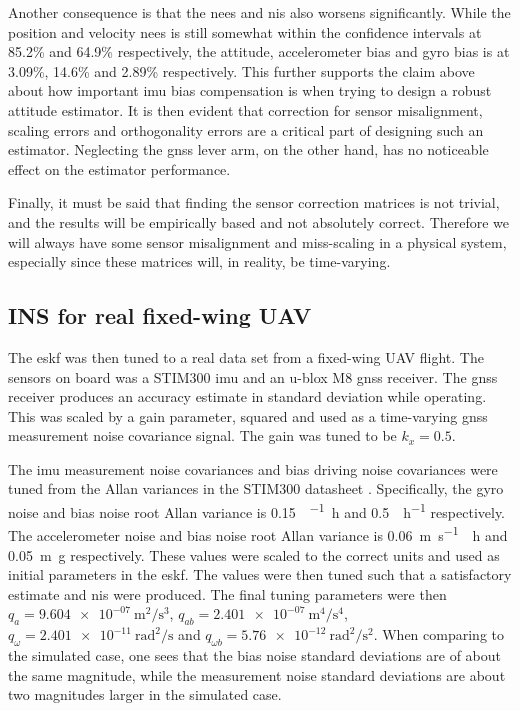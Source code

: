 Another consequence is that the \acrshort{nees} and \acrshort{nis} also worsens significantly. While the position and velocity \acrshort{nees} is still somewhat within the confidence intervals at 85.2\% and 64.9\% respectively, the attitude, accelerometer bias and gyro bias is at 3.09\%, 14.6\% and 2.89\% respectively. This further supports the claim above about how important \acrshort{imu} bias compensation is when trying to design a robust attitude estimator. It is then evident that correction for sensor misalignment, scaling errors and orthogonality errors are a critical part of designing such an estimator. Neglecting the \acrshort{gnss} lever arm, on the other hand, has no noticeable effect on the estimator performance.

Finally, it must be said that finding the sensor correction matrices is not trivial, and the results will be empirically based and not absolutely correct. Therefore we will always have some sensor misalignment and miss-scaling in a physical system, especially since these matrices will, in reality, be time-varying.

\subsection{INS for real fixed-wing UAV}


The \acrshort{eskf} was then tuned to a real data set from a fixed-wing UAV flight. The sensors on board was a STIM300 \acrshort{imu} and an u-blox M8 \acrshort{gnss} receiver. The \acrshort{gnss} receiver produces an accuracy estimate in standard deviation while operating. This was scaled by a gain parameter, squared and used as a time-varying \acrshort{gnss} measurement noise covariance signal. The gain was tuned to be $k_x = 0.5$.

The \acrshort{imu} measurement noise covariances and bias driving noise covariances were tuned from the Allan variances in the STIM300 datasheet \cite{stim300}. Specifically, the gyro noise and bias noise root Allan variance is \SI{0.15}{\deg\per\sqrt\hour} and \SI{0.5}{\deg\per\hour} respectively. The accelerometer noise and bias noise root Allan variance is \SI{0.06}{\meter\per\second\sqrt\hour} and \SI{0.05}{\meter g} respectively. These values were scaled to the correct units and used as initial parameters in the \acrshort{eskf}. The values were then tuned such that a satisfactory estimate and \acrshort{nis} were produced. The final tuning parameters were 
then $q_{a} = \SI{9.604e-07}{\meter\squared\per\second\cubed}$, $ q_{ab} = \SI{2.401e-07}{\meter\tothe{4}\per\second\tothe{4}}$, $q_{\omega} = \SI{2.401e-11}{\radian\squared\per\second}$ and $q_{\omega b} = \SI{5.76e-12}{\radian\squared\per\second\squared}$. When comparing to the simulated case, one sees that the bias noise standard deviations are of about the same magnitude, while the measurement noise standard deviations are about two magnitudes larger in the simulated case.

